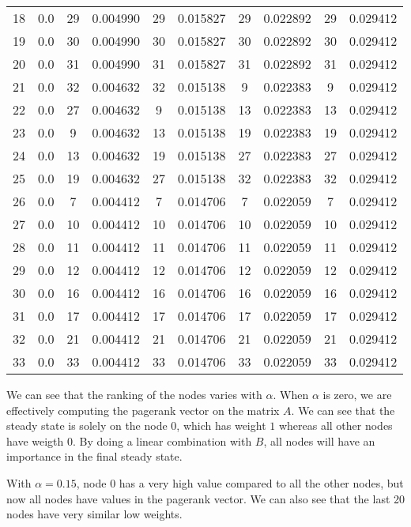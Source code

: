 \documentclass[]{article}
\begin{document}
\begin{center}
{\begin{tabular}{|c|c|c|c|c|c|c|c|c|c|}
18 & 0.0 & 29 &   0.004990 & 29 & 0.015827 & 29 & 0.022892 & 29 & 0.029412\\
19 & 0.0 & 30 &   0.004990 & 30 & 0.015827 & 30 & 0.022892 & 30 & 0.029412\\
20 & 0.0 & 31 &   0.004990 & 31 & 0.015827 & 31 & 0.022892 & 31 & 0.029412\\
21 & 0.0 & 32 &   0.004632 & 32 & 0.015138 & 9 & 0.022383 & 9 & 0.029412\\
22 & 0.0 & 27 &   0.004632 & 9 & 0.015138 & 13 & 0.022383 & 13 & 0.029412\\
23 & 0.0 & 9  &  0.004632 & 13 & 0.015138 & 19 & 0.022383 & 19 & 0.029412\\
24 & 0.0 & 13 &   0.004632 & 19 & 0.015138 & 27 & 0.022383 & 27 & 0.029412\\
25 & 0.0 & 19 &   0.004632 & 27 & 0.015138 & 32 & 0.022383 & 32 & 0.029412\\
26 & 0.0 & 7  &  0.004412 & 7 & 0.014706 & 7 & 0.022059 & 7 & 0.029412\\
27 & 0.0 & 10 &   0.004412 & 10 & 0.014706 & 10 & 0.022059 & 10 & 0.029412\\
28 & 0.0 & 11 &   0.004412 & 11 & 0.014706 & 11 & 0.022059 & 11 & 0.029412\\
29 & 0.0 & 12 &   0.004412 & 12 & 0.014706 & 12 & 0.022059 & 12 & 0.029412\\
30 & 0.0 & 16 &   0.004412 & 16 & 0.014706 & 16 & 0.022059 & 16 & 0.029412\\
31 & 0.0 & 17 &   0.004412 & 17 & 0.014706 & 17 & 0.022059 & 17 & 0.029412\\
32 & 0.0 & 21 &   0.004412 & 21 & 0.014706 & 21 & 0.022059 & 21 & 0.029412\\
33 & 0.0 & 33 &   0.004412 & 33 & 0.014706 & 33 & 0.022059 & 33 & 0.029412\\
\hline
\end{tabular}}
\end{center}

We can see that the ranking of the nodes varies with $\alpha$. When $\alpha$ is zero, we are effectively computing the pagerank vector on the matrix $A$. We can see that the steady state is solely on the node $0$, which has weight $1$ whereas all other nodes have weigth $0$. By doing a linear combination with $B$, all nodes will have an importance in the final steady state.

With $\alpha = 0.15$, node $0$ has a very high value compared to all the other nodes, but now all nodes have values in the pagerank vector. We can also see that the last 20 nodes have very similar low weights.
\end{document}
